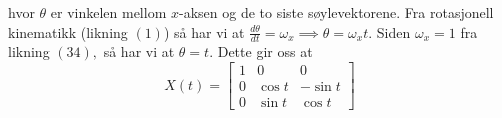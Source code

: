 hvor $\theta$ er vinkelen mellom $x$-aksen og de to siste søylevektorene. Fra rotasjonell kinematikk (likning $(1)$) så har vi at $\frac{d\theta}{dt}=\omega_x\implies\theta=\omega_xt.$ Siden $\omega_x=1$ fra likning $(34),$ så har vi at $\theta=t.$ Dette gir oss at 
\begin{equation}
    X(t)=\begin{bmatrix}1&0&0\\0&\cos t&-\sin t\\0&\sin t&\cos t\end{bmatrix}
\end{equation}